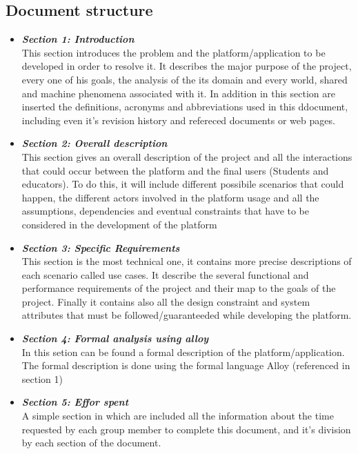 \documentclass{article}
\begin{document}
{\subsection{Document structure}
\begin{itemize}
    \item \textbf{\textit{Section 1: Introduction}} \\
          This section introduces the problem and the platform/application to be developed in order to resolve it. It describes the major purpose of the project, every one of his goals, the analysis of the its domain and every world, shared and machine phenomena associated with it.
          In addition in this section are inserted the definitions, acronyms and abbreviations used in this ddocument, including even it's revision history and refereced documents or web pages.
    \item \textbf{\textit{Section 2: Overall description}} \\
          This section gives an overall description of the project and all the interactions that could occur between the platform and the final users (Students and educators). To do this, it will include different possibile scenarios that could happen, the different actors involved in the platform usage and all the assumptions, dependencies and eventual constraints that have to be considered in the development of the platform
    \item \textbf{\textit{Section 3: Specific Requirements}} \\
          This section is the most technical one, it contains more precise descriptions of each scenario called use cases. It describe the several functional and performance requirements of the project and their map to the goals of the project.
          Finally it contains also all the design constraint and system attributes that must be followed/guaranteeded while developing the platform.
    \item \textbf{\textit{Section 4: Formal analysis using alloy}} \\
          In this setion can be found a formal description of the platform/application. The formal description is done using the formal language Alloy (referenced in section 1)
    \item \textbf{\textit{Section 5: Effor spent}} \\
          A simple section in which are included all the information about the time requested by each group member to complete this document, and it's division by each section of the document.
\end{itemize}

}
\end{document}
